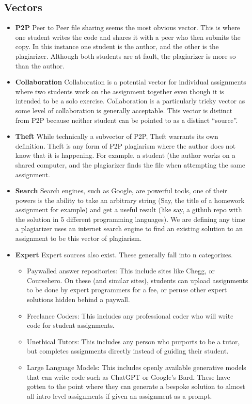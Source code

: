 \documentclass[conference]{IEEEtran}
\begin{document}
\subsection*{\textbf{Vectors}}
\begin{itemize}
\item \textbf{P2P} Peer to Peer file sharing seems the most obvious vector.  This is where one student writes the code and shares it with a peer who then submits the copy.  In this instance one student is the author, and the other is the plagiarizer.  Although both students are at fault, the plagiarizer is more so than the author.  
	
	\item \textbf{Collaboration} Collaboration is a potential vector for individual assignments where two students work on the assignment together even though it is intended to be a solo exercise.  Collaboration is a particularly tricky vector as some level of collaboration is generally acceptable.  This vector is distinct from P2P because neither student can be pointed to as a distinct ``source''.
	
	\item \textbf{Theft}  While technically a subvector of P2P, Theft warrants its own definition.  Theft is any form of P2P plagiarism where the author does not know that it is happening.  For example, a student (the author works on a shared computer, and the plagiarizer finds the file when attempting the same assignment.  
	
	\item \textbf{Search}  Search engines, such as Google, are powerful tools, one of their powers is the ability to take an arbitrary string (Say, the title of a homework assignment for example) and get a useful result (like say, a github repo with the solution in 5 different programming languages).  We are defining any time a plagiarizer uses an internet search engine to find an existing solution to an assignment to be this vector of plagiarism.
	
	\item \textbf{Expert} Expert sources also exist.  These generally fall into n categorizes.
	\begin{itemize}
	\item Paywalled answer repositories:  This include sites like Chegg, or Coursehero.  On these (and similar sites), students can upload assignments to be done by expert programmers for a fee, or peruse other expert solutions hidden behind a paywall.  
	\item Freelance Coders: This includes any professional coder who will write code for student assignments.
	\item Unethical Tutors: This includes any person who purports to be a tutor, but completes assignments directly instead of guiding their student.
	\item Large Language Models:  This includes openly available generative models that can write code such as ChatGPT or Google's Bard.  These have gotten to the point where they can generate a bespoke solution to almost all intro level assignments if given an assignment as a prompt.
	

\end{itemize}
\end{itemize}
\end{document}
